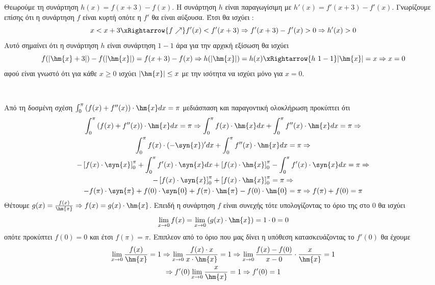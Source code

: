 \documentclass[internet]{diag-pan-xelatex}
\begin{document}
\begin{thema}
\begin{erwthma}
\item Θεωρούμε τη συνάρτηση $ h(x)=f(x+3)-f(x) $. Η συνάρτηση $ h $ είναι παραγωγίσιμη με $ h'(x)=f'(x+3)-f'(x) $. Γνωρίζουμε επίσης ότι η συνάρτηση $ f $ είναι κυρτή οπότε η $ f' $ θα είναι αύξουσα. Έτσι θα ισχύει :
\[ x<x+3\xRightarrow{f\nearrow} f'(x)<f'(x+3)\Rightarrow f'(x+3)-f'(x)>0\Rightarrow h'(x)>0 \]
Αυτό σημαίνει ότι η συνάρτηση $ h $ είναι συνάρτηση $ 1-1 $ άρα για την αρχική εξίσωση θα ισχύει
\[ f(|\hm{x}+3|)-f(|\hm{x}|)=f(x+3)-f(x)\Rightarrow h(|\hm{x}|)=h(x)\xRightarrow{h\ 1-1}|\hm{x}|=x\Rightarrow x=0 \]
αφού είναι γνωστό ότι για κάθε $ x\geq0 $ ισχύει $ |\hm{x}|\leq x $ με την ισότητα να ισχύει μόνο για $ x=0 $.
\end{erwthma}
\newpage
\noindent
\item \mbox{}\\\vspace{-5mm}
\begin{erwthma}
\item\label{d1} Από τη δοσμένη σχέση $ \int_{0}^{\pi}{\left(f(x)+f''(x)\right)\cdot\hm{x}dx }=\pi $ μεδιάσπαση και παραγοντική ολοκλήρωση προκύπτει ότι
\begin{gather*}
\int_{0}^{\pi}{\left(f(x)+f''(x)\right)\cdot\hm{x}dx }=\pi
\Rightarrow\int_{0}^{\pi}{f(x)\cdot\hm{x}dx}+\int_{0}^{\pi}{f''(x)\cdot\hm{x}dx}=\pi\Rightarrow\\ \int_{0}^{\pi}{f(x)\cdot(-\syn{x})'dx}+\int_{0}^{\pi}{f''(x)\cdot\hm{x}dx}=\pi\Rightarrow\\
-\left[f(x)\cdot\syn{x}\right]_{0}^{\pi}+\int_{0}^{\pi}{f'(x)\cdot\syn{x}dx}+\left[f(x)\cdot\hm{x} \right]_{0}^{\pi}-\int_{0}^{\pi}{f'(x)\cdot\syn{x}dx}=\pi\Rightarrow\\
-\left[f(x)\cdot\syn{x}\right]_{0}^{\pi}+\left[f(x)\cdot\hm{x} \right]_{0}^{\pi}=\pi \Rightarrow\\ -f(\pi)\cdot\syn{\pi}+f(0)\cdot\syn{0}+f(\pi)\cdot\hm{\pi}-f(0)\cdot\hm{0}=\pi\Rightarrow f(\pi)+f(0)=\pi
\end{gather*}
Θέτουμε $ g(x)=\frac{f(x)}{\hm{x}}\Rightarrow f(x)=g(x)\cdot\hm{x} $. Επειδή η συνάρτηση $ f $ είναι συνεχής τότε υπολογίζοντας το όριο της στο $ 0 $ θα ισχύει
\[ \lim_{x\to0}f(x)=\lim_{x\to0}\left( g(x)\cdot\hm{x}\right)=1\cdot0=0 \] οπότε προκύπτει $ f(0)=0 $ και έτσι $ f(\pi)=\pi $. Επιπλεον από το όριο που μας δίνει η υπόθεση κατασκευάζοντας το $ f'(0) $ θα έχουμε 
\begin{gather*}
\lim_{x\to0}{\frac{f(x)}{\hm{x}}}=1\Rightarrow \lim_{x\to0}{\frac{f(x)\cdot x}{x\cdot\hm{x}}}=1\Rightarrow \lim_{x\to0}{\frac{f(x)-f(0)}{x-0}\cdot\frac{x}{\hm{x}}}=1\\\Rightarrow f'(0)\lim_{x\to0}{\frac{x}{\hm{x}}}=1\Rightarrow f'(0)=1

\end{gather*}
\end{erwthma}
\end{thema}
\end{document}
